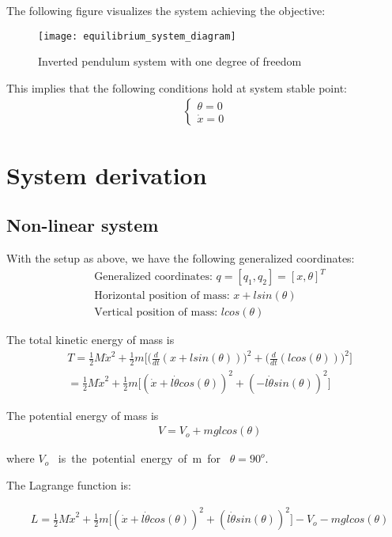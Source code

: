 \documentclass [12pt,letterpaper]{exam}
\begin{document}
The following figure visualizes the system achieving the objective:
\begin{figure}[h]
  \centering
    \texttt{[image: equilibrium\_system\_diagram]} 
  \caption{Inverted pendulum system with one degree of freedom}
  \label{fig:system_diagram}
\end{figure}

This implies that the following conditions hold at system stable point:
\begin{align}
\begin{cases}
\theta = 0 \\
\dot{x} = 0
\end{cases}
\end{align}

\newpage
\section{System derivation}
\subsection{Non-linear system}
With the setup as above, we have the following generalized coordinates:
\begin{align}
& \mbox{Generalized coordinates: } q = [q_1, q_2] = [x, \theta]^T \\
& \mbox{Horizontal position of mass: } x + lsin(\theta) \\
& \mbox{Vertical position of mass: } lcos(\theta)
\end{align}

The total kinetic energy of mass is
\begin{align} 
& T = \frac{1}{2}M\dot{x}^2 + \frac{1}{2}m\bigg[\bigg(\frac{d}{dt}(x + lsin(\theta))\bigg)^2 + \bigg(\frac{d}{dt}(lcos(\theta))\bigg)^2\bigg] \\
& = \frac{1}{2}M\dot{x}^2 + \frac{1}{2}m\bigg[(\dot{x} + l\dot{\theta}cos(\theta))^2 + (-l\dot{\theta}sin(\theta))^2\bigg]
\end{align}

The potential energy of mass is
\begin{align} 
& V = V_o + mglcos(\theta)
\end{align}

where $V_o$ \mbox{ is the potential energy of m for } $\theta = 90^o$.

The Lagrange function is:

\begin{align}
& L = \frac{1}{2}M\dot{x}^2 + \frac{1}{2}m\big[(\dot{x} + l\dot{\theta}cos(\theta))^2 + (l\dot{\theta}sin(\theta))^2\big] - V_o - mglcos(\theta)
\end{align}
\end{document}
